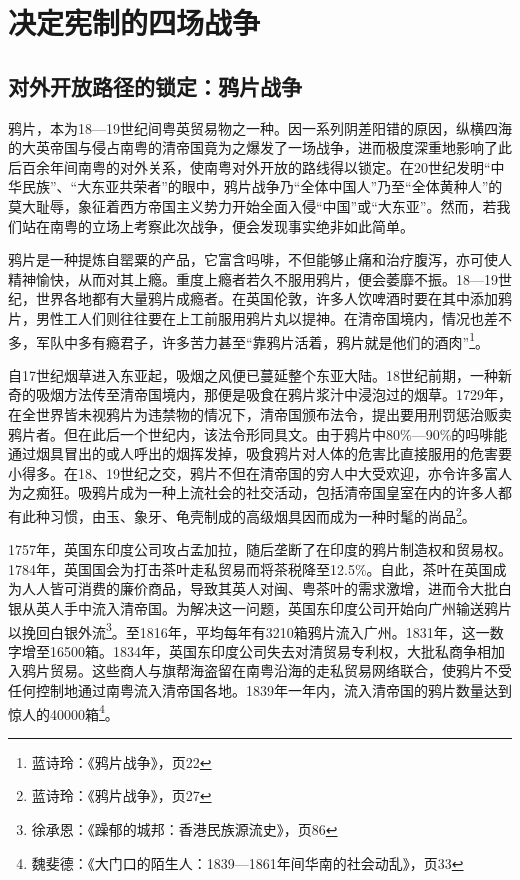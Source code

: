 \chapter{决定宪制的四场战争}

\section{对外开放路径的锁定：鸦片战争}

鸦片，本为18—19世纪间粤英贸易物之一种。因一系列阴差阳错的原因，纵横四海的大英帝国与侵占南粤的清帝国竟为之爆发了一场战争，进而极度深重地影响了此后百余年间南粤的对外关系，使南粤对外开放的路线得以锁定。在20世纪发明“中华民族”、“大东亚共荣者”的眼中，鸦片战争乃“全体中国人”乃至“全体黄种人”的莫大耻辱，象征着西方帝国主义势力开始全面入侵“中国”或“大东亚”。然而，若我们站在南粤的立场上考察此次战争，便会发现事实绝非如此简单。

鸦片是一种提炼自罂粟的产品，它富含吗啡，不但能够止痛和治疗腹泻，亦可使人精神愉快，从而对其上瘾。重度上瘾者若久不服用鸦片，便会萎靡不振。18—19世纪，世界各地都有大量鸦片成瘾者。在英国伦敦，许多人饮啤酒时要在其中添加鸦片，男性工人们则往往要在上工前服用鸦片丸以提神。在清帝国境内，情况也差不多，军队中多有瘾君子，许多苦力甚至“靠鸦片活着，鸦片就是他们的酒肉”\footnote{蓝诗玲：《鸦片战争》，页22}。

自17世纪烟草进入东亚起，吸烟之风便已蔓延整个东亚大陆。18世纪前期，一种新奇的吸烟方法传至清帝国境内，那便是吸食在鸦片浆汁中浸泡过的烟草。1729年，在全世界皆未视鸦片为违禁物的情况下，清帝国颁布法令，提出要用刑罚惩治贩卖鸦片者。但在此后一个世纪内，该法令形同具文。由于鸦片中80\%—90\%的吗啡能通过烟具冒出的或人呼出的烟挥发掉，吸食鸦片对人体的危害比直接服用的危害要小得多。在18、19世纪之交，鸦片不但在清帝国的穷人中大受欢迎，亦令许多富人为之痴狂。吸鸦片成为一种上流社会的社交活动，包括清帝国皇室在内的许多人都有此种习惯，由玉、象牙、龟壳制成的高级烟具因而成为一种时髦的尚品\footnote{蓝诗玲：《鸦片战争》，页27}。

1757年，英国东印度公司攻占孟加拉，随后垄断了在印度的鸦片制造权和贸易权。1784年，英国国会为打击茶叶走私贸易而将茶税降至12.5\%。自此，茶叶在英国成为人人皆可消费的廉价商品，导致其英人对闽、粤茶叶的需求激增，进而令大批白银从英人手中流入清帝国。为解决这一问题，英国东印度公司开始向广州输送鸦片以挽回白银外流\footnote{徐承恩：《躁郁的城邦：香港民族源流史》，页86}。至1816年，平均每年有3210箱鸦片流入广州。1831年，这一数字增至16500箱。1834年，英国东印度公司失去对清贸易专利权，大批私商争相加入鸦片贸易。这些商人与旗帮海盗留在南粤沿海的走私贸易网络联合，使鸦片不受任何控制地通过南粤流入清帝国各地。1839年一年内，流入清帝国的鸦片数量达到惊人的40000箱\footnote{魏斐德：《大门口的陌生人：1839—1861年间华南的社会动乱》，页33}。

